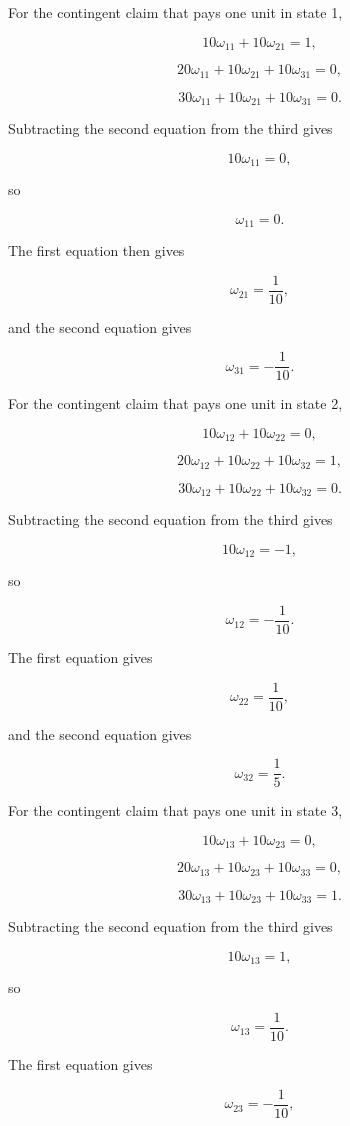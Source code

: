 \documentclass{article}
\begin{document}
For the contingent claim that pays one unit in state 1,

\[
10\omega_{11}+10\omega_{21}=1,
\]

\[
20\omega_{11}+10\omega_{21}+10\omega_{31}=0,
\]

\[
30\omega_{11}+10\omega_{21}+10\omega_{31}=0.
\]

Subtracting the second equation from the third gives

\[
10\omega_{11}=0,
\]

so

\[
\omega_{11}=0.
\]

The first equation then gives

\[
\omega_{21}=\frac{1}{10},
\]

and the second equation gives

\[
\omega_{31}=-\frac{1}{10}.
\]

For the contingent claim that pays one unit in state 2,

\[
10\omega_{12}+10\omega_{22}=0,
\]

\[
20\omega_{12}+10\omega_{22}+10\omega_{32}=1,
\]

\[
30\omega_{12}+10\omega_{22}+10\omega_{32}=0.
\]

Subtracting the second equation from the third gives

\[
10\omega_{12}=-1,
\]

so

\[
\omega_{12}=-\frac{1}{10}.
\]

The first equation gives

\[
\omega_{22}=\frac{1}{10},
\]

and the second equation gives

\[
\omega_{32}=\frac{1}{5}.
\]

For the contingent claim that pays one unit in state 3,

\[
10\omega_{13}+10\omega_{23}=0,
\]

\[
20\omega_{13}+10\omega_{23}+10\omega_{33}=0,
\]

\[
30\omega_{13}+10\omega_{23}+10\omega_{33}=1.
\]

Subtracting the second equation from the third gives

\[
10\omega_{13}=1,
\]

so

\[
\omega_{13}=\frac{1}{10}.
\]

The first equation gives

\[
\omega_{23}=-\frac{1}{10},
\]
\end{document}
